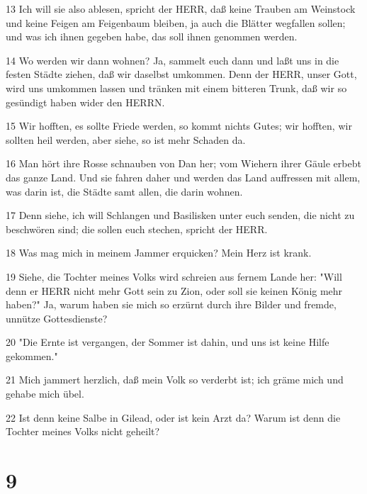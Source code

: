 \par 13 Ich will sie also ablesen, spricht der HERR, daß keine Trauben am Weinstock und keine Feigen am Feigenbaum bleiben, ja auch die Blätter wegfallen sollen; und was ich ihnen gegeben habe, das soll ihnen genommen werden.
\par 14 Wo werden wir dann wohnen? Ja, sammelt euch dann und laßt uns in die festen Städte ziehen, daß wir daselbst umkommen. Denn der HERR, unser Gott, wird uns umkommen lassen und tränken mit einem bitteren Trunk, daß wir so gesündigt haben wider den HERRN.
\par 15 Wir hofften, es sollte Friede werden, so kommt nichts Gutes; wir hofften, wir sollten heil werden, aber siehe, so ist mehr Schaden da.
\par 16 Man hört ihre Rosse schnauben von Dan her; vom Wiehern ihrer Gäule erbebt das ganze Land. Und sie fahren daher und werden das Land auffressen mit allem, was darin ist, die Städte samt allen, die darin wohnen.
\par 17 Denn siehe, ich will Schlangen und Basilisken unter euch senden, die nicht zu beschwören sind; die sollen euch stechen, spricht der HERR.
\par 18 Was mag mich in meinem Jammer erquicken? Mein Herz ist krank.
\par 19 Siehe, die Tochter meines Volks wird schreien aus fernem Lande her: "Will denn er HERR nicht mehr Gott sein zu Zion, oder soll sie keinen König mehr haben?" Ja, warum haben sie mich so erzürnt durch ihre Bilder und fremde, unnütze Gottesdienste?
\par 20 "Die Ernte ist vergangen, der Sommer ist dahin, und uns ist keine Hilfe gekommen."
\par 21 Mich jammert herzlich, daß mein Volk so verderbt ist; ich gräme mich und gehabe mich übel.
\par 22 Ist denn keine Salbe in Gilead, oder ist kein Arzt da? Warum ist denn die Tochter meines Volks nicht geheilt?

\chapter{9}

